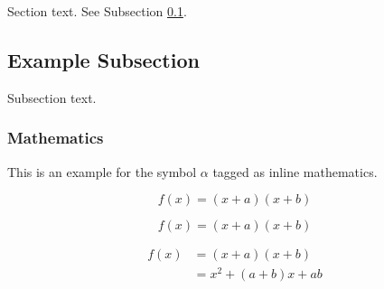 \documentclass[preprint,12pt,authoryear]{elsarticle}
\begin{document}
Section text. See Subsection \ref{subsec1}.

\subsection{Example Subsection}
\label{subsec1}

Subsection text.


\subsubsection{Mathematics}
This is an example for the symbol $\alpha$ tagged as inline mathematics.

\begin{equation}
f(x) = (x+a)(x+b)
\end{equation}

\begin{equation*}
f(x) = (x+a)(x+b)
\end{equation*}

\begin{align}
 f(x) &= (x+a)(x+b) \\
      &= x^2 + (a+b)x + ab
\end{align}
\end{document}

